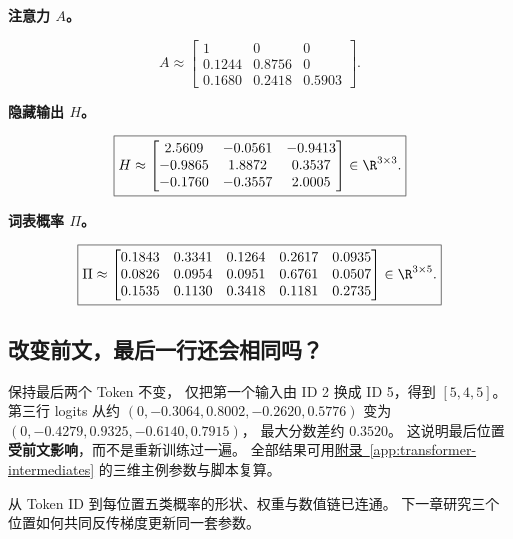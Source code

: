 \noindent\textbf{注意力 $A$。}\par
\begin{equation}
\boxed{A\approx\begin{bmatrix}
1&0&0\\
0.1244&0.8756&0\\
0.1680&0.2418&0.5903
\end{bmatrix}.}
\end{equation}

\noindent\textbf{隐藏输出 $H$。}\par
\begin{equation}
\boxed{H\approx\begin{bmatrix}
2.5609&-0.0561&-0.9413\\
-0.9865&1.8872&0.3537\\
-0.1760&-0.3557&2.0005
\end{bmatrix}\in\R^{3\times3}.}
\end{equation}

\noindent\textbf{词表概率 $\Pi$。}\par
\begin{equation}
\boxed{\Pi\approx\begin{bmatrix}
0.1843&0.3341&0.1264&0.2617&0.0935\\
0.0826&0.0954&0.0951&0.6761&0.0507\\
0.1535&0.1130&0.3418&0.1181&0.2735
\end{bmatrix}\in\R^{3\times5}.}
\end{equation}


\subsection{改变前文，最后一行还会相同吗？}

保持最后两个 Token 不变，
仅把第一个输入由 ID 2 换成 ID 5，得到 $[5,4,5]$。
第三行 logits 从约
$(0,-0.3064,0.8002,-0.2620,0.5776)$
变为
$(0,-0.4279,0.9325,-0.6140,0.7915)$，
最大分数差约 $0.3520$。
这说明最后位置\textbf{受前文影响}，而不是重新训练过一遍。
全部结果可用\hyperref[app:transformer-intermediates]{附录~\ref*{app:transformer-intermediates}} 的三维主例参数与脚本复算。



\par\smallskip
从 Token ID 到每位置五类概率的形状、权重与数值链已连通。
下一章研究三个位置如何共同反传梯度更新同一套参数。
